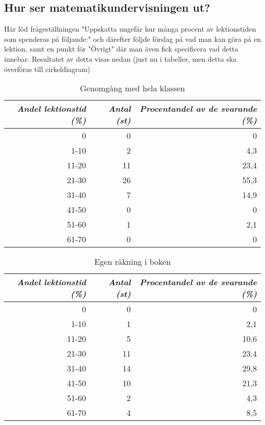 \subsection{Hur ser matematikundervisningen ut?}

\textcolor{lila}{Här löd frågeställningen "Uppskatta ungefär hur många procent av lektionstiden som spenderas på följande:" och därefter följde förslag på vad man kan göra på en lektion, samt en punkt för "Övrigt" där man även fick specificera vad detta innebar. Resultatet av detta visas nedan (just nu i tabeller, men detta ska överföras till cirkeldiagram)}

\begin{table}
\caption{Genomgång med hela klassen}
\centering
\begin{tabular}{||r|r|r||} \hline\hline
\emph{Andel lektionstid (\%)} & \emph{Antal (st)} & \emph{Procentandel av de svarande (\%)} \\ \hline
\hline
0 & 0 & 0 \\ \hline
1-10 & 2 & 4,3 \\ \hline
11-20 & 11 & 23,4 \\ \hline
21-30 & 26 & 55,3 \\ \hline
31-40 & 7 & 14,9 \\ \hline
41-50 & 0 & 0 \\ \hline
51-60 & 1 & 2,1 \\ \hline
61-70 & 0 & 0 \\ \hline\hline
\end{tabular}
\label{table:Genomgang}
\end{table}


\begin{table}
\caption{Egen räkning i boken}
\centering
\begin{tabular}{||r|r|r||} \hline\hline
\emph{Andel lektionstid (\%)} & \emph{Antal (st)} & \emph{Procentandel av de svarande (\%)} \\ \hline
\hline
0 & 0 & 0 \\ \hline
1-10 & 1 & 2,1 \\ \hline
11-20 & 5 & 10,6 \\ \hline
21-30 & 11 & 23,4 \\ \hline
31-40 & 14 & 29,8 \\ \hline
41-50 & 10 & 21,3 \\ \hline
51-60 & 2 & 4,3 \\ \hline
61-70 & 4 & 8,5 \\ \hline\hline
\end{tabular}
\label{table:Rakning}
\end{table}


